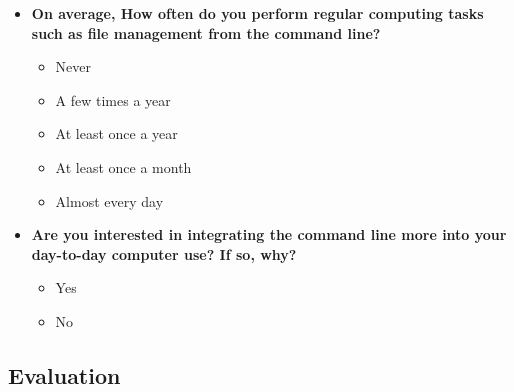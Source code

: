 \begin{itemize}
	\item  \textbf{On average, How often do you perform regular computing tasks such as file management from the command line?}
	      \begin{itemize}
		      \item Never
		      \item A few times a year
		      \item At least once a year
		      \item At least once a month
		      \item Almost every day
	      \end{itemize}

	\item  \textbf{Are you interested in integrating the command line more into your day-to-day computer use? If so, why?}
	      \begin{itemize}
		      \item  Yes
		      \item No
	      \end{itemize}
\end{itemize}

\subsection{Evaluation}

